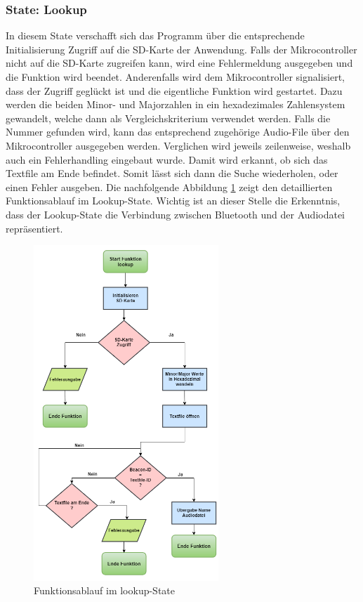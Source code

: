 \subsubsection*{State: Lookup}
In diesem State verschafft sich das Programm über die entsprechende Initialisierung Zugriff auf die SD-Karte der Anwendung. Falls der Mikrocontroller nicht auf die SD-Karte zugreifen kann, wird eine Fehlermeldung ausgegeben und die Funktion wird beendet. Anderenfalls wird dem Mikrocontroller signalisiert, dass der Zugriff geglückt ist und die eigentliche Funktion wird gestartet. Dazu werden die beiden Minor- und Majorzahlen in ein hexadezimales Zahlensystem gewandelt, welche dann als Vergleichskriterium verwendet werden. Falls die Nummer gefunden wird, kann das entsprechend zugehörige Audio-File über den Mikrocontroller ausgegeben werden. Verglichen wird jeweils zeilenweise, weshalb auch ein Fehlerhandling eingebaut wurde. Damit wird erkannt, ob sich das Textfile am Ende befindet. Somit lässt sich dann die Suche wiederholen, oder einen Fehler ausgeben. Die nachfolgende Abbildung \ref{fig:lookupState} zeigt den detaillierten Funktionsablauf im Lookup-State. Wichtig ist an dieser Stelle die Erkenntnis, dass der Lookup-State die Verbindung zwischen Bluetooth und der Audiodatei repräsentiert.

\begin{figure}[htbp!!!!]
	\centering
	\includegraphics[width=0.62\textwidth]{Data/lookup_picture}
	\caption[Statemachine: lookup]{Funktionsablauf im lookup-State}
	\label{fig:lookupState}
\end{figure} 

